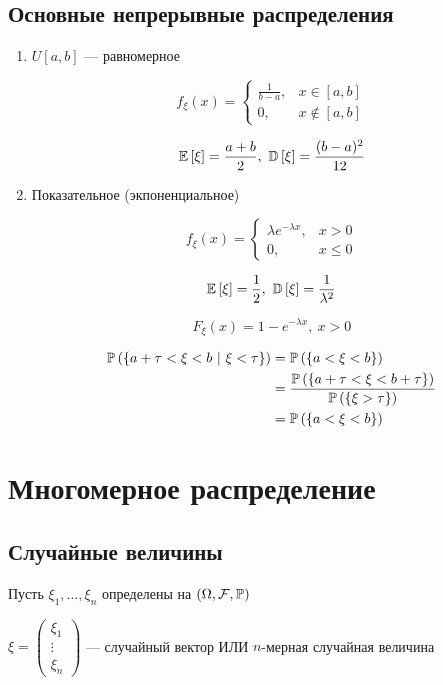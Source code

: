\documentclass[a4paper, 10pt]{article}
\begin{document}
\subsection{Основные непрерывные распределения}
\begin{enumerate}
    \item $U[a, b]$ — равномерное

    $$f_\xi(x)=\begin{cases}
        \frac{1}{b-a}, & x\in[a, b]\\
        0, & x\not\in[a, b]
    \end{cases}$$
    
    $$\matwait{\xi}=\frac{a+b}{2},\ \dispersia{\xi}=\frac{(b-a)^2}{12}$$

    \item Показательное (экпоненциальное)

    $$f_\xi(x)=\begin{cases}
        \lambda e^{-\lambda x}, & x>0\\
        0, & x\leqslant 0
    \end{cases}$$
    
    $$\matwait{\xi}=\frac{1}{2},\ \dispersia{\xi}=\frac{1}{\lambda^2}$$
    
    $$F_\xi(x)=1-e^{-\lambda x},\ x>0$$
    
    \begin{equation*}
        \begin{aligned}
            \prob{a+\tau<\xi<b\ |\ \xi<\tau}&=\prob{a<\xi<b}\\
            &=\frac{\prob{a+\tau<\xi<b+\tau}}{\prob{\xi>\tau}}\\
            &=\prob{a<\xi<b}
        \end{aligned}
    \end{equation*}
    
\end{enumerate}


\newpage
\section{Многомерное распределение}
\subsection{Случайные величины}
Пусть $\xi_1,\ldots,\xi_n$ определены на $(\Omega,\mathcal{F},\mathbb{P})$

 $\xi=\begin{pmatrix}
    \xi_1\\
    \vdots\\
    \xi_n
\end{pmatrix}$ — случайный вектор ИЛИ $n$-мерная случайная величина
\end{document}
